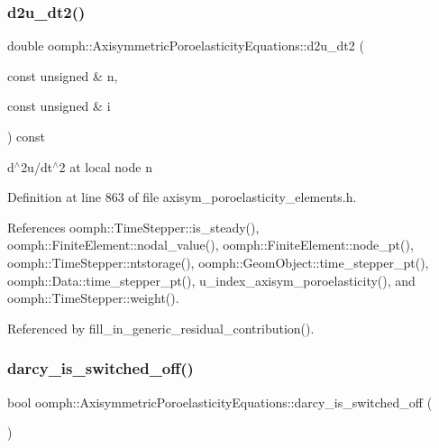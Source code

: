 \subsubsection{\texorpdfstring{d2u\+\_\+dt2()}{d2u\_dt2()}}
{\footnotesize\ttfamily double oomph\+::\+Axisymmetric\+Poroelasticity\+Equations\+::d2u\+\_\+dt2 (\begin{DoxyParamCaption}\item[{const unsigned \&}]{n,  }\item[{const unsigned \&}]{i }\end{DoxyParamCaption}) const\hspace{0.3cm}{\ttfamily [inline]}}



d$^\wedge$2u/dt$^\wedge$2 at local node n 



Definition at line 863 of file axisym\+\_\+poroelasticity\+\_\+elements.\+h.



References oomph\+::\+Time\+Stepper\+::is\+\_\+steady(), oomph\+::\+Finite\+Element\+::nodal\+\_\+value(), oomph\+::\+Finite\+Element\+::node\+\_\+pt(), oomph\+::\+Time\+Stepper\+::ntstorage(), oomph\+::\+Geom\+Object\+::time\+\_\+stepper\+\_\+pt(), oomph\+::\+Data\+::time\+\_\+stepper\+\_\+pt(), u\+\_\+index\+\_\+axisym\+\_\+poroelasticity(), and oomph\+::\+Time\+Stepper\+::weight().



Referenced by fill\+\_\+in\+\_\+generic\+\_\+residual\+\_\+contribution().

\mbox{\label{classoomph_1_1AxisymmetricPoroelasticityEquations_aaaff3ab360c7a99c6595624b035700a3}} 
\subsubsection{\texorpdfstring{darcy\+\_\+is\+\_\+switched\+\_\+off()}{darcy\_is\_switched\_off()}}
{\footnotesize\ttfamily bool oomph\+::\+Axisymmetric\+Poroelasticity\+Equations\+::darcy\+\_\+is\+\_\+switched\+\_\+off (\begin{DoxyParamCaption}{ }\end{DoxyParamCaption})\hspace{0.3cm}{\ttfamily [inline]}}



